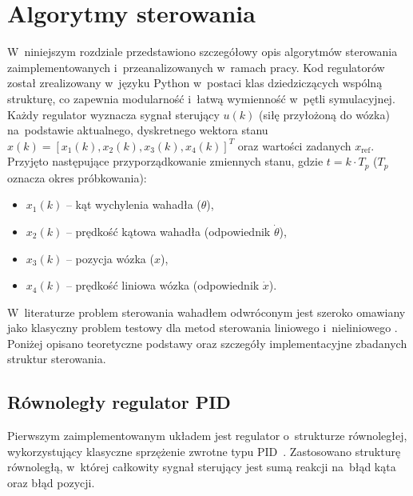 \section{Algorytmy sterowania}

W~niniejszym rozdziale przedstawiono szczegółowy opis algorytmów sterowania
zaimplementowanych i~przeanalizowanych w~ramach pracy. Kod regulatorów został
zrealizowany w~języku Python w~postaci klas dziedziczących wspólną strukturę,
co zapewnia modularność i~łatwą wymienność w~pętli symulacyjnej. Każdy
regulator wyznacza sygnał sterujący $u(k)$ (siłę przyłożoną do wózka)
na~podstawie aktualnego, dyskretnego wektora stanu
$x(k) = [x_1(k), x_2(k), x_3(k), x_4(k)]^T$ oraz wartości zadanych
$x_{\mathrm{ref}}$. Przyjęto następujące przyporządkowanie zmiennych stanu, 
gdzie $t = k \cdot T_p$ ($T_p$ oznacza okres próbkowania):
\begin{itemize}
    \item $x_1(k)$ -- kąt wychylenia wahadła ($\theta$),
    \item $x_2(k)$ -- prędkość kątowa wahadła (odpowiednik $\dot{\theta}$),
    \item $x_3(k)$ -- pozycja wózka ($x$),
    \item $x_4(k)$ -- prędkość liniowa wózka (odpowiednik $\dot{x}$).
\end{itemize}

W~literaturze problem sterowania wahadłem odwróconym jest szeroko omawiany
jako klasyczny problem testowy dla metod sterowania liniowego i~nieliniowego
\cite{Prasad2014, Nguyen2024}. Poniżej opisano teoretyczne podstawy oraz szczegóły
implementacyjne zbadanych struktur sterowania.

\subsection{Równoległy regulator PID}

Pierwszym zaimplementowanym układem jest regulator o~strukturze równoległej,
wykorzystujący klasyczne sprzężenie zwrotne typu PID~\cite{Prasad2014}. 
Zastosowano strukturę równoległą, w~której
całkowity sygnał sterujący jest sumą reakcji na~błąd kąta oraz błąd pozycji.

